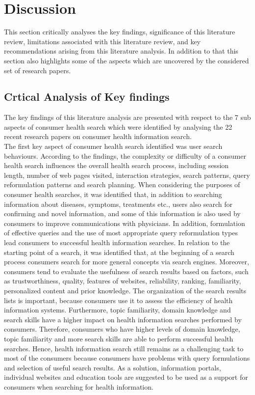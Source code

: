 \documentclass[]{article}
\begin{document}
	
\section{Discussion}

This section critically analyses the key findings, significance of this literature review, limitations associated with this literature review, and key recommendations arising from this literature analysis. In addition to that this section also highlights some of the aspects which are uncovered by the considered set of research papers. \\

\subsection{Crtical Analysis of Key findings}

The key findings of this literature analysis are presented with respect to the 7 sub aspects of consumer health search which were identified by analysing the 22 recent research papers on consumer health information search.\\ 

The first key aspect of consumer health search identified was user search behaviours. According to the findings, the complexity or difficulty of a consumer health search influences the overall health search process, including session length, number of web pages visited, interaction strategies, search patterns, query reformulation patterns and search planning. When considering the purposes of consumer health searches, it was identified that, in addition to searching information about diseases, symptoms, treatments etc., users also search for confirming and novel information, and some of this information is also used by consumers to improve communications with physicians. In addition, formulation of effective queries and the use of most appropriate query reformulation types lead consumers to successful health information searches. In relation to the starting point of a search, it was identified that, at the beginning of a search process consumers search for more general concepts via search engines. Moreover, consumers tend to evaluate the usefulness of search results based on factors, such as trustworthiness, quality, features of websites, reliability, ranking, familiarity, personalized content and prior knowledge. The organization of the search results lists is important, because consumers use it to assess the efficiency of health information systems. Furthermore, topic familiarity, domain knowledge and search skills have a higher impact on health information searches performed by consumers. Therefore, consumers who have higher levels of domain knowledge, topic familiarity and more search skills are able to perform successful health searches. Hence, health information search still remains as a challenging task to most of the consumers because consumers have problems with query formulations and selection of useful search results. As a solution, information portals, individual websites and education tools are suggested to be used as a support for consumers when searching for health information.\\ 
\end{document}
